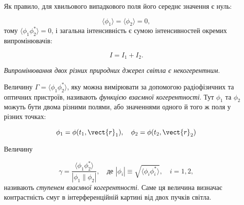 \begin{enumerate}
	      Як правило, для хвильового випадкового поля його середнє значення є нуль:

	      \begin{equation*}
		      \langle \phi_1 \rangle = \langle \phi_2 \rangle = 0,
	      \end{equation*}
	      тому \(\langle \phi_1 \phi_2^{*} \rangle = 0\), і загальна інтенсивність є сумою інтенсивностей окремих
	      випромінювачів:

	      \begin{equation*}
		      I = I_1 + I_2.
	      \end{equation*}

	      \emph{Випромінювання двох різних природних джерел світла є некогерентним}.

\end{enumerate}

Величину \(\Gamma = \langle \phi_1 \phi_2^{*} \rangle\), яку можна вимірювати за допомогою радіофізичних та оптичних
	пристроїв, називають \emph{функцією взаємної когерентності}. Тут \(\phi_1\) та
	\(\phi_2\) можуть бути двома різними полями, або значеннями одного й того ж поля у різних точках:

\begin{equation*}
	\phi_1 = \phi(t_1, \vect{r}_1), \quad \phi_2 = \phi(t_2, \vect{r}_2)
\end{equation*}

Величину

\begin{equation*}
	\gamma = \frac{\langle \phi_1 \phi_2^{*} \rangle}{|\phi_1\|\phi_2|}, \quad \text{де } |\phi_i| \equiv \sqrt{\langle \phi_i \phi_i^{*} \rangle}, \quad i
	= 1, 2,
\end{equation*}
%
називають \emph{ступенем взаємної когерентності}. Саме ця величина визначає
контрастність смуг в інтерференційній картині від двох пучків світла.

